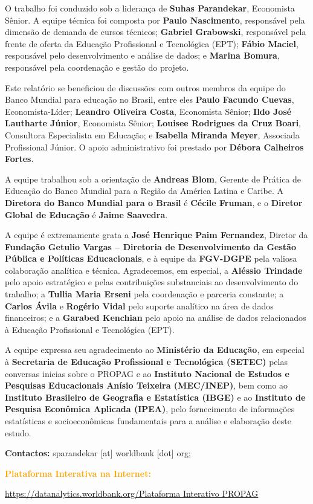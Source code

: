 O trabalho foi conduzido sob a liderança de \textbf{Suhas Parandekar}, Economista Sênior. 
A equipe técnica foi composta por \textbf{Paulo Nascimento}, responsável pela dimensão de demanda de cursos técnicos; \textbf{Gabriel Grabowski}, responsável pela frente de oferta da Educação Profissional e Tecnológica (EPT); \textbf{Fábio Maciel}, responsável pelo desenvolvimento e análise de dados; e 
\textbf{Marina Bomura}, responsável pela coordenação e gestão do projeto.

Este relatório se beneficiou de discussões com outros membros da equipe do Banco Mundial para educação no Brasil, entre eles \textbf{Paulo Facundo Cuevas}, Economista-Líder; \textbf{Leandro Oliveira Costa}, Economista Sênior; \textbf{Ildo José Lautharte Júnior}, Economista Sênior; \textbf{Louisee Rodrigues da Cruz Boari}, Consultora Especialista em Educação; e \textbf{Isabella Miranda Meyer}, Associada Profissional Júnior.  O apoio administrativo foi prestado por \textbf{Débora Calheiros Fortes}.

A equipe trabalhou sob a orientação de \textbf{Andreas Blom}, Gerente de Prática de Educação do Banco Mundial para a Região da América Latina e Caribe.  
A \textbf{Diretora do Banco Mundial para o Brasil} é \textbf{Cécile Fruman}, e o \textbf{Diretor Global de Educação} é \textbf{Jaime Saavedra}.

A equipe é extremamente grata a \textbf{José Henrique Paim Fernandez}, Diretor da \textbf{Fundação Getulio Vargas – Diretoria de Desenvolvimento da Gestão Pública e Políticas Educacionais}, e à equipe da 
\textbf{FGV-DGPE} pela valiosa colaboração analítica e técnica.
Agradecemos, em especial, a \textbf{Aléssio Trindade} pelo apoio estratégico e pelas contribuições substanciais ao desenvolvimento do trabalho;  
a \textbf{Tullia Maria Erseni} pela coordenação e parceria constante;  
a \textbf{Carlos Ávila} e \textbf{Rogério Vidal} pelo suporte analítico na área de dados financeiros;  
e a \textbf{Garabed Kenchian} pelo apoio na análise de dados relacionados à Educação Profissional e Tecnológica (EPT).

A equipe expressa seu agradecimento ao \textbf{Ministério da Educação}, em especial à \textbf{Secretaria de Educação Profissional e Tecnológica (SETEC)} pelas conversas inicias sobre o PROPAG e ao \textbf{Instituto Nacional de Estudos e Pesquisas Educacionais Anísio Teixeira (MEC/INEP)}, bem como ao \textbf{Instituto Brasileiro de Geografia e Estatística (IBGE)} e ao \textbf{Instituto de Pesquisa Econômica Aplicada (IPEA)}, pelo fornecimento de informações estatísticas e socioeconômicas fundamentais para a análise e elaboração deste estudo.


\vspace{2em}

\textbf{Contactos:} sparandekar [at]  worldbank [dot]  org; 



\textbf{\textcolor{orange}{Plataforma Interativa na Internet:}}

\href{https://datanalytics.worldbank.org/content/6604f317-d487-436a-b6b6-792369b341f0}{https://datanalytics.worldbank.org/Plataforma Interativo PROPAG} 
